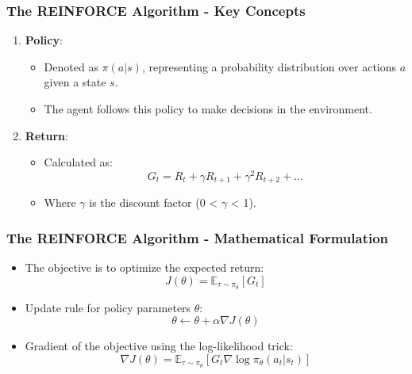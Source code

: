\documentclass{beamer}
\begin{document}
\begin{frame}[fragile]
    \frametitle{The REINFORCE Algorithm - Key Concepts}
    \begin{enumerate}
        \item \textbf{Policy}:
        \begin{itemize}
            \item Denoted as \( \pi(a|s) \), representing a probability distribution over actions \( a \) given a state \( s \).
            \item The agent follows this policy to make decisions in the environment.
        \end{itemize}
        
        \item \textbf{Return}:
        \begin{itemize}
            \item Calculated as:
            \begin{equation}
            G_t = R_t + \gamma R_{t+1} + \gamma^2 R_{t+2} + \ldots
            \end{equation}
            \item Where \( \gamma \) is the discount factor (0 < \( \gamma \) < 1).
        \end{itemize}
    \end{enumerate}
\end{frame}

\begin{frame}[fragile]
    \frametitle{The REINFORCE Algorithm - Mathematical Formulation}
    \begin{itemize}
        \item The objective is to optimize the expected return:
        \begin{equation}
        J(\theta) = \mathbb{E}_{\tau \sim \pi_\theta} \left[ G_t \right]
        \end{equation}
        \item Update rule for policy parameters \( \theta \):
        \begin{equation}
        \theta \leftarrow \theta + \alpha \nabla J(\theta)
        \end{equation}
        \item Gradient of the objective using the log-likelihood trick:
        \begin{equation}
        \nabla J(\theta) = \mathbb{E}_{\tau \sim \pi_\theta} \left[ G_t \nabla \log \pi_\theta(a_t|s_t) \right]
        \end{equation}
    \end{itemize}
\end{frame}
\end{document}
